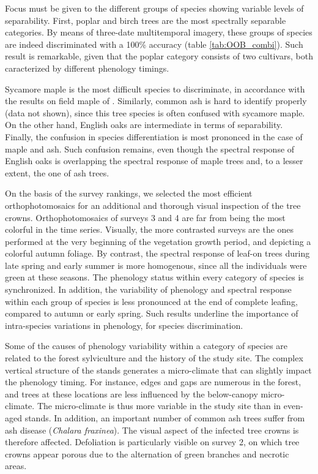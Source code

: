 \documentclass[remotesensing,article,submit,moreauthors,pdftex,12pt,a4paper]{mdpi} %
\begin{document}
Focus must be given to the different groups of species showing variable levels of separability. 
First, poplar and birch trees are the most spectrally separable categories. 
By means of three-date multitemporal imagery, these groups of species are indeed discriminated with a 100\% accuracy (table \ref{tab:OOB_combi}). 
Such result is remarkable, given that the poplar category consists of two cultivars, both caracterized by different phenology timings. 

Sycamore maple is the most difficult species to discriminate, in accordance with the results on field maple of \citeauthor{hill_mapping_2010} \cite{hill_mapping_2010}. 
Similarly, common ash is hard to identify properly (data not shown), since this tree species is often confused with sycamore maple. 
On the other hand, English oaks are intermediate in terms of separability. 
Finally, the confusion in species differentiation is most prononced in the case of maple and ash. Such confusion remains, even though the spectral response of English oaks is overlapping the spectral response of maple trees and, to a lesser extent, the one of ash trees. 

On the basis of the survey rankings, we selected the most efficient orthophotomosaics for an additional and thorough visual inspection of the tree crowns. 
Orthophotomosaics of surveys 3 and 4 are far from being the most colorful in the time series. 
Visually, the more contrasted surveys are the ones performed at the very beginning of the vegetation growth period, and depicting a colorful autumn foliage. 
By contrast, the spectral response of leaf-on trees during late spring and early summer is more homogenous, since all the individuals were green at these seasons. 
The phenology status within every category of species is synchronized. 
In addition, the variability of phenology and spectral response within each group of species is less pronounced at the end of complete leafing, compared to autumn or early spring. 
Such results underline the importance of intra-species variations in phenology, for species discrimination.

Some of the causes of phenology variability within a category of species are related to the forest sylviculture and the history of the study site. 
The complex vertical structure of the stands generates a micro-climate that can slightly impact the phenology timing. 
For instance, edges and gaps are numerous in the forest, and trees at these locations are less influenced by the below-canopy micro-climate. 
The micro-climate is thus more variable in the study site than in even-aged stands. 
In addition, an important number of common ash trees suffer from ash disease (\textit{Chalara fraxinea}). 
The visual aspect of the infected tree crowns is therefore affected. 
Defoliation is particularly visible on survey 2, on which tree crowns appear porous due to the alternation of green branches and necrotic areas. 
\end{document}
